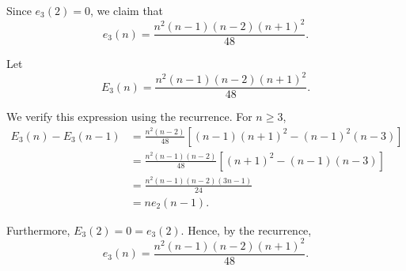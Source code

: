 \documentclass[11pt,a4paper]{article}
\begin{document}
Since $e_3(2)=0$, we claim that
\[
e_3(n)=
\frac{n^2(n-1)(n-2)(n+1)^2}{48}.
\]

Let
\[
E_3(n)=
\frac{n^2(n-1)(n-2)(n+1)^2}{48}.
\]

We verify this expression using the recurrence. For $n\geq 3$,
\[
\begin{aligned}
E_3(n)-E_3(n-1)
&=\frac{n^2(n-2)}{48}
\left[
(n-1)(n+1)^2-(n-1)^2(n-3)
\right]\\
&=\frac{n^2(n-1)(n-2)}{48}
\left[
(n+1)^2-(n-1)(n-3)
\right]\\
&=\frac{n^2(n-1)(n-2)(3n-1)}{24}\\
&=ne_2(n-1).
\end{aligned}
\]

Furthermore, $E_3(2)=0=e_3(2)$. Hence, by the recurrence,
\[
\boxed{
e_3(n)=
\frac{n^2(n-1)(n-2)(n+1)^2}{48}
}.
\]
\end{document}
